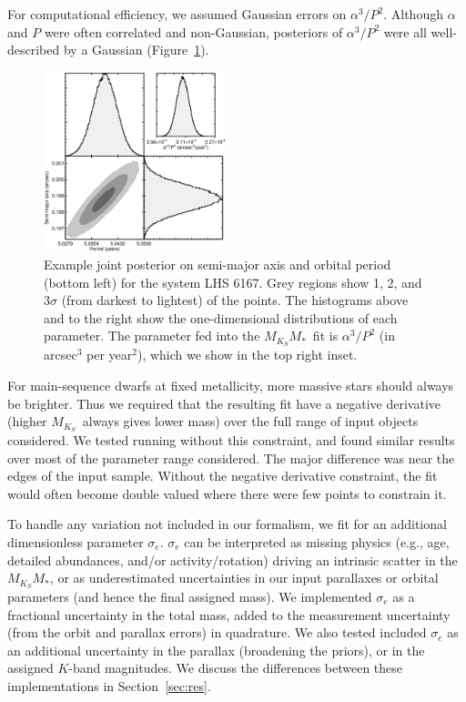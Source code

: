 \documentclass[twocolumn]{aastex62}
\newcommand{\mks}{$M_{K_S}$}
\newcommand{\mmk}{$M_{K_S}$\textendash$M_*$}
\begin{document}
For computational efficiency, we assumed Gaussian errors on $\alpha^3/P^2$. Although $\alpha$ and $P$ were often correlated and non-Gaussian, posteriors of $\alpha^3/P^2$ were all well-described by a Gaussian (Figure~\ref{fig:correlated}). 

\begin{figure}[htb]
\begin{center}
\includegraphics[width=0.47\textwidth]{LHS6167_corner.eps}
\caption{Example joint posterior on semi-major axis and orbital period (bottom left) for the system LHS 6167. Grey regions show 1, 2, and 3$\sigma$ (from darkest to lightest) of the points. The histograms above and to the right show the one-dimensional distributions of each parameter. The parameter fed into the \mmk\ fit is $\alpha^3/P^2$ (in arcsec$^3$ per year$^2$), which we show in the top right inset. }
\label{fig:correlated}
\end{center}
\end{figure}

For main-sequence dwarfs at fixed metallicity, more massive stars should always be brighter. Thus we required that the resulting fit have a negative derivative (higher \mks\ always gives lower mass) over the full range of input objects considered. We tested running without this constraint, and found similar results over most of the parameter range considered. The major difference was near the edges of the input sample. Without the negative derivative constraint, the fit would often become double valued where there were few points to constrain it.

To handle any variation not included in our formalism, we fit for an additional dimensionless parameter $\sigma_e$. $\sigma_e$ can be interpreted as missing physics (e.g., age, detailed abundances, and/or activity/rotation) driving an intrinsic scatter in the \mmk, or as underestimated uncertainties in our input parallaxes or orbital parameters (and hence the final assigned mass). We implemented $\sigma_e$ as a fractional uncertainty in the total mass, added to the measurement uncertainty (from the orbit and parallax errors) in quadrature. We also tested included $\sigma_e$ as an additional uncertainty in the parallax (broadening the priors), or in the assigned $K$-band magnitudes. We discuss the differences between these implementations in Section~\ref{sec:res}.%
\end{document}
